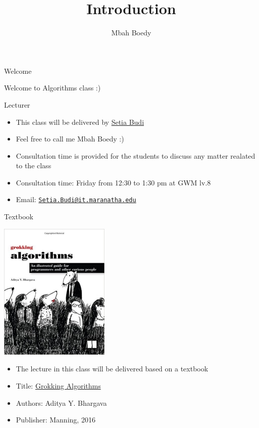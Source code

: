 \documentclass[ignorenonframetext,]{beamer}
\title{Introduction}
\author{Mbah Boedy}
\date{}
\providecommand{\tightlist}{%
  \setlength{\itemsep}{0pt}\setlength{\parskip}{0pt}}
\begin{document}
\frame{\titlepage}

\begin{frame}{Welcome}
\protect\hypertarget{welcome}{}

Welcome to Algorithms class :)

\end{frame}

\begin{frame}{Lecturer}
\protect\hypertarget{lecturer}{}

\begin{itemize}
\tightlist
\item
  This class will be delivered by
  \href{http://it.maranatha.edu/resume/setiabudi/}{Setia Budi}
\item
  Feel free to call me Mbah Boedy :)
\item
  Consultation time is provided for the students to discuss any matter
  realated to the class
\item
  Consultation time: Friday from 12:30 to 1:30 pm at GWM lv.8
\item
  Email:
  \href{mailto:Setia.Budi@it.maranatha.edu}{\nolinkurl{Setia.Budi@it.maranatha.edu}}
\end{itemize}

\end{frame}

\begin{frame}{Textbook}
\protect\hypertarget{textbook}{}

\includegraphics{./Introduction-figure/textbook.jpg}

\begin{itemize}
\tightlist
\item
  The lecture in this class will be delivered based on a textbook
\item
  Title:
  \href{https://www.manning.com/books/grokking-algorithms}{Grokking
  Algorithms}
\item
  Authors: Aditya Y. Bhargava\\
\item
  Publisher: Manning, 2016
\end{itemize}

\end{frame}
\end{document}
